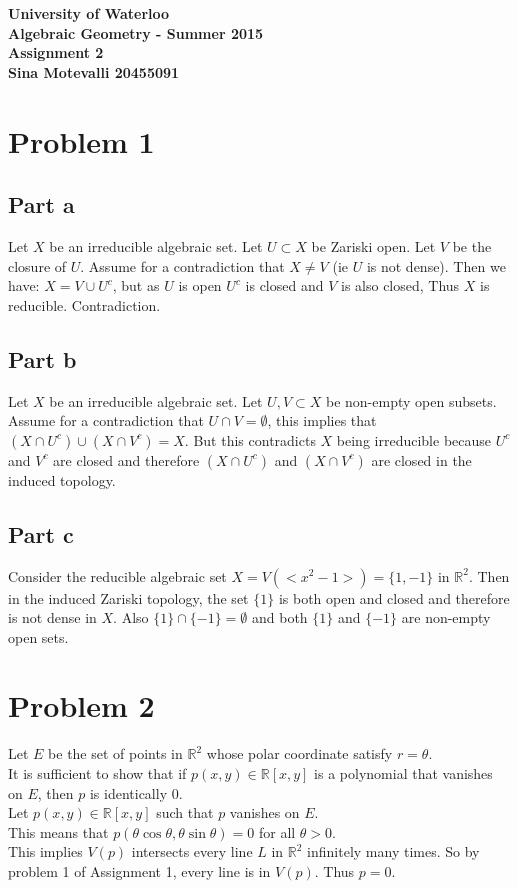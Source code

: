 \documentclass[12pt]{article}
\begin{document}
\begin{center}
  {\Large\bf University of Waterloo}\\
  \vspace{3mm}
         {\Large\bf Algebraic Geometry - Summer 2015}\\
         \vspace{2mm}
                {\Large\bf Assignment 2}\\
                \vspace{3mm}
                \textbf{Sina Motevalli 20455091}
\end{center}
\section*{Problem 1}
\subsection*{Part a}
Let $X$ be an irreducible algebraic set. Let $U \subset X$ be Zariski open. Let $V$ be the closure of $U$. Assume for a contradiction that $X \not= V$ (ie $U$ is not dense). Then we have: $X=V \cup U^c $, but as $U$ is open $U^c$ is closed and $V$ is also closed, Thus $X$ is reducible. Contradiction.
\subsection*{Part b}
Let $X$ be an irreducible algebraic set. Let $U,V \subset X$ be non-empty open subsets.
Assume for a contradiction that $U \cap V = \emptyset$, this implies that $(X \cap U^c) \cup (X \cap V^c)=X$. But this contradicts $X$ being irreducible because $U^c$
and $V^c$ are closed and therefore $(X \cap U^c)$ and $(X \cap V^c)$ are closed in the induced topology.
\subsection*{Part c}
Consider the reducible algebraic set $X=V(<x^2-1>)=\{1,-1\}$ in $\mathbb{R}^2$. Then in the induced Zariski topology, the set $\{1\}$ is both open and closed and therefore is not dense in $X$. Also $\{1\} \cap \{-1\}=\emptyset$ and both $\{1\}$ and $\{-1\}$ are non-empty open sets.
\section*{Problem 2}
Let $E$ be the set of points in $\mathbb{R}^2$ whose polar coordinate satisfy $r=\theta$. \\
It is sufficient to show that if $p(x,y) \in \mathbb{R}[x,y]$ is a polynomial that vanishes on $E$, then $p$ is identically $0$. \\
Let $p(x,y) \in \mathbb{R}[x,y]$ such that $p$ vanishes on $E$.\\
 This means that $p (\theta \cos \theta , \theta \sin \theta )=0 $ for all $\theta >0$. \\
This implies $V(p)$ intersects every line $L$ in $\mathbb{R}^2$ infinitely many times. So by problem 1 of Assignment 1, every line is in $V(p)$. Thus $p=0$.
\end{document}
